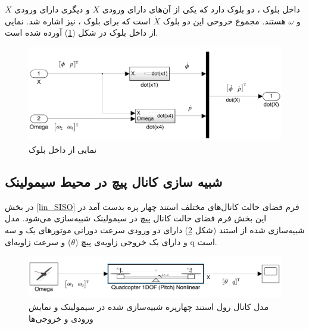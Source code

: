 داخل بلوک
،
دو بلوک دارد که یکی از آن‌های دارای ورودی $X$ و دیگری دارای ورودی $X$ و $\omega$ هستند. مجموع خروحی این دو بلوک $\dot X$ است که برای بلوک
،
نیز اشاره شد.
نمایی از داخل بلوک
در شکل (\ref{roll_all-six}) آورده شده است.
\begin{figure}[H]
	\includegraphics[width=16cm]{../../Figures/QuadSimulation/roll_all-six.png}
	\centering
	\caption{نمایی از داخل بلوک }
	\label{roll_all-six}
\end{figure}

\subsection{شبیه سازی کانال پیچ در محیط سیمولینک}
در بخش
\ref{lin_SISO}
فرم فضای حالت کانال‌های مختلف استند چهار پره بدست آمد در این بخش فرم فضای حالت کانال پیچ در سیمولینک شبیه‌سازی می‌شود.
مدل شبیه‌سازی شده از استند (شکل \ref{pitch_simulink}) دارای دو ورودی سرعت دورانی موتورهای یک و سه  و دارای یک خروجی زاویه‌ی پیچ ($\theta$) و  سرعت زاویه‌ای q است.
\begin{figure}[H]
	\includegraphics[width=16cm]{../../Figures/QuadSimulation/pitch_Stand_Model.png}
	\centering
	\vspace*{-15mm}
	\caption{مدل کانال رول استند چهارپره شبیه‌سازی شده در سیمولینک و نمایش ورودی و خروجی‌ها}
	\label{pitch_simulink}
\end{figure}

